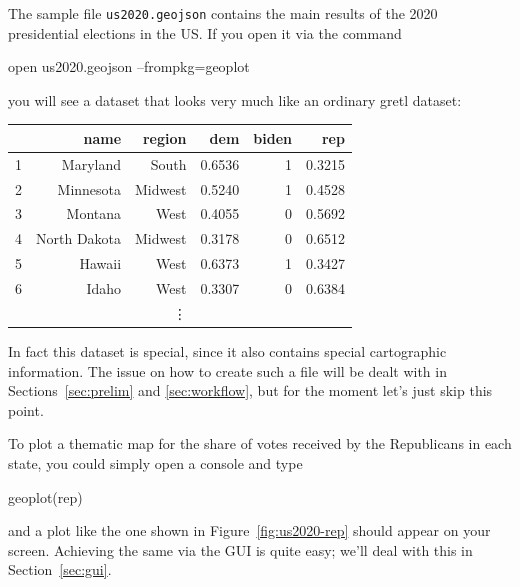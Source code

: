 \documentclass{article}
\begin{document}
The sample file \texttt{us2020.geojson} contains the main results of
the 2020 presidential elections in the US. If you open it via the
command
\begin{code}
  open us2020.geojson --frompkg=geoplot
\end{code}
you will see a dataset that looks very much like an ordinary gretl
dataset:
\begin{center}
\begin{tabular}{rrrrrr}
\hline
   &          name &   region &         dem &    biden &      rep  \\ 
\hline                                                   
 1 &      Maryland &    South &      0.6536 &        1 &   0.3215  \\ 
 2 &     Minnesota &  Midwest &      0.5240 &        1 &   0.4528  \\ 
 3 &       Montana &     West &      0.4055 &        0 &   0.5692  \\ 
 4 &  North Dakota &  Midwest &      0.3178 &        0 &   0.6512  \\ 
 5 &        Hawaii &     West &      0.6373 &        1 &   0.3427  \\ 
 6 &         Idaho &     West &      0.3307 &        0 &   0.6384  \\ 
\multicolumn{6}{c}{\vdots} \\  
\hline
\end{tabular}
\end{center}

In fact this dataset is special, since it also contains special
cartographic information. The issue on how to create such a file will
be dealt with in Sections~\ref{sec:prelim} and \ref{sec:workflow}, but
for the moment let's just skip this point.

To plot a thematic map for the share of votes received by the
Republicans in each state, you could simply open a console and type
\begin{code}
geoplot(rep)
\end{code}
and a plot like the one shown in Figure~\ref{fig:us2020-rep}
should appear on your screen. Achieving the same via the GUI is quite
easy; we'll deal with this in Section~\ref{sec:gui}.
\end{document}

